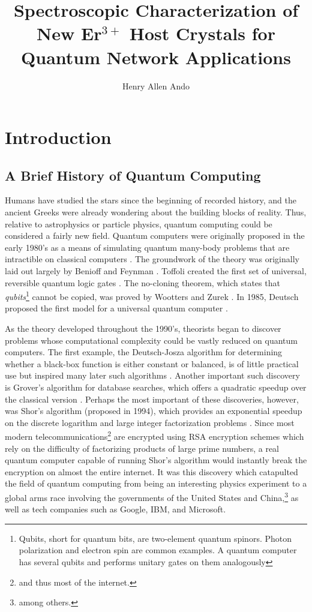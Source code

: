 \documentclass[12pt]{puthesis}
\title{Spectroscopic Characterization of New Er$^{3+}$ Host Crystals for Quantum Network Applications}
\author{Henry Allen Ando}
\begin{document}
\makefrontmatter


\chapter{Introduction}
\section{A Brief History of Quantum Computing}
\label{sec:brief-hist-quant}

Humans have studied the stars since the beginning of recorded history, and the ancient Greeks were already wondering about the building blocks of reality. Thus, relative to astrophysics or particle physics, quantum computing could be considered a fairly new field. Quantum computers were originally proposed in the early 1980's as a means of simulating quantum many-body problems that are intractible on classical computers \cite{Feynman1982}. The groundwork of the theory was originally laid out largely by Benioff and Feynman \cite{Benioff1980,Feynman1982}. Toffoli created the first set of universal, reversible quantum logic gates \cite{Toffoli1980}. The no-cloning theorem, which states that \textit{qubits}\footnote{ Qubits, short for quantum bits, are two-element quantum spinors. Photon polarization and electron spin are common examples. A quantum computer has several qubits and performs unitary gates on them analogously } cannot be copied, was proved by Wootters and Zurek \cite{Wootters1982}. In 1985, Deutsch proposed the first model for a universal quantum computer \cite{Deutsch1985}.

As the theory developed throughout the 1990's, theorists began to discover problems whose computational complexity could be vastly reduced on quantum computers. The first example, the Deutsch-Josza algorithm for determining whether a black-box function is either constant or balanced, is of little practical use but inspired many later such algorithms \cite{Deutsch1992}. Another important such discovery is Grover's algorithm for database searches, which offers a quadratic speedup over the classical version \cite{Grover1996}. Perhaps the most important of these discoveries, however, was Shor's algorithm (proposed in 1994), which provides an exponential speedup on the discrete logarithm and large integer factorization problems \cite{Shor1994}. Since most modern telecommunications\footnote{ and thus most of the internet.} are encrypted using RSA encryption schemes which rely on the difficulty of factorizing products of large prime numbers, a real quantum computer capable of running Shor's algorithm would instantly break the encryption on almost the entire internet. It was this discovery which catapulted the field of quantum computing from being an interesting physics experiment to a global arms race involving the governments of the United States and China,\footnote{ among others.} as well as tech companies such as Google, IBM, and Microsoft. 
\end{document}
